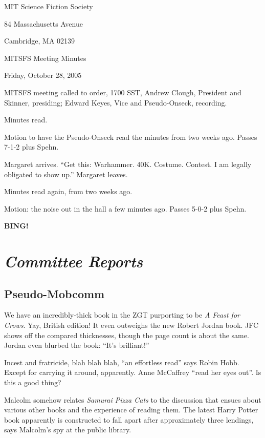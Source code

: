 \documentclass[10pt]{article}
\newcommand{\bing}{{\bf BING!} }
\newcommand{\goto}[1]{\bing \vskip 12pt \section*{{\em{#1}}}}
\newcommand{\ps}{ plus Spehn\xspace}
\begin{document}
\begin{center}

MIT Science Fiction Society

84 Massachusetts Avenue

Cambridge, MA 02139

\vspace{12pt}

MITSFS Meeting Minutes

Friday, October 28, 2005

\end{center}

\vspace{18pt}

\setlength{\parskip}{6pt}

\noindent
MITSFS meeting called to order, 1700 SST, Andrew Clough, President and 
Skinner, presiding; Edward Keyes, Vice and Pseudo-Onseck, recording.

Minutes read.

Motion to have the Pseudo-Onseck read the minutes from two weeks
ago.  Passes 7-1-2\ps.

Margaret arrives.  ``Get this: Warhammer.  40K.  Costume.  Contest.
I am legally obligated to show up.''  Margaret leaves.

Minutes read again, from two weeks ago.

Motion: the noise out in the hall a few minutes ago.  Passes 5-0-2\ps.

\goto{Committee Reports}

\subsection*{Pseudo-Mobcomm}

We have an incredibly-thick book in the ZGT purporting to be {\em A Feast
for Crows}.  Yay, British edition!  It even outweighs the new Robert Jordan
book.  JFC shows off the compared thicknesses, though the page count
is about the same.  Jordan even blurbed the book: ``It's brilliant!''

Incest and fratricide, blah blah blah, ``an effortless read'' says Robin
Hobb.  Except for carrying it around, apparently.  Anne McCaffrey
``read her eyes out''.  Is this a good thing?

Malcolm somehow relates {\em Samurai Pizza Cats} to the discussion that
ensues about various other books and the experience of reading them.  The
latest Harry Potter book apparently is constructed to fall apart
after approximately three lendings, says Malcolm's spy at the public
library.
\end{document}
